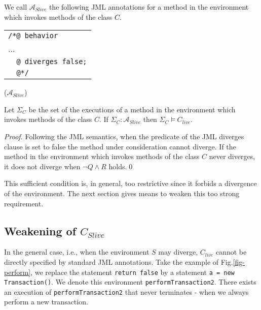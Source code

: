 We call $\mathcal{A}_{Slive}$ the following JML annotations for a method in
the environment which invokes methods of the class $C$.\\  
%
\begin{tabular}{l}
\hspace{8em}\verb+/*@ behavior+\\
\hspace{8em}...\\
\hspace{8em}\verb+  @ diverges false;+\\
\hspace{8em}\verb+  @*/+
\end{tabular} \hspace{12em} ($\mathcal{A}_{Slive}$)



\begin{proposition}
\label{prop-livelock}
Let $\Sigma_{C}$ be the set of the executions of a method in the
environment which invokes methods of the class $C$. 
If $\Sigma_C : \mathcal{A}_{Slive}$
then $\Sigma_{C} \models C_{live}$.
\end{proposition}
\begin{proof}
  Following the JML semantics, when the predicate of the JML
  diverges clause is set to false the method under consideration
  cannot diverge.  If the method in the environment which invokes methods
  of the class $C$ never diverges, it does not diverge when $\neg Q \wedge
  R$ holds.\qed
\end{proof}

This sufficient condition is, in general, too restrictive since it forbids
a divergence of the environment. The next section gives means to weaken
this too strong requirement. 

\subsection{Weakening of $C_{Slive}$}

In the general case, i.e., when the environment $S$
may diverge, %
$C_{live}$ cannot be directly specified by standard JML
annotations. Take the example of Fig.\ref{fig-perform}, we
replace the statement \verb+return false+ by a statement
\verb+a = new Transaction()+. %
We denote this environment \texttt{performTransaction2}. There
exists an execution of \texttt{performTransaction2} that
never terminates - when we always perform a new transaction.


